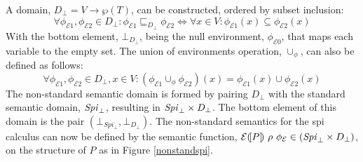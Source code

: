 \documentclass{entcs} \usepackage{entcsmacro}
\begin{document}
A domain, $D_\bot=V\to\wp(T)$, can be constructed, ordered by subset inclusion:
\[\forall\phi_{\mathcal{E}1},\phi_{\mathcal{E}2}\in D_\bot: \phi_{\mathcal{E}1}\sqsubseteq_{D_\bot}\phi_{\mathcal{E}2}\Leftrightarrow\forall x\in V:\phi_{\mathcal{E}1}(x)\subseteq\phi_{\mathcal{E}2}(x)\]
With the bottom element, $\bot_{D_\bot}$, being the null environment, $\phi_{\mathcal{E}0}$, that maps each variable to the empty set. The union of environments operation, $\cup_\phi$, can also be defined as follows:
\[\forall\phi_{\mathcal{E}1},\phi_{\mathcal{E}2}\in D_\bot,x\in V: (\phi_{\mathcal{E}1}\cup_\phi\phi_{\mathcal{E}2})(x)=\phi_{\mathcal{E}1}(x)\cup\phi_{\mathcal{E}2}(x)\]
The non-standard semantic domain is formed by pairing $D_\bot$ with the standard semantic domain, $\mbox{{\itshape Spi\/}}_\bot$, resulting in $\mbox{{\itshape Spi\/}}_\bot\times D_\bot$.  The bottom element of this domain is the pair $(\bot_{Spi_\bot},\bot_{D_\bot})$.  The non-standard semantics for the spi calculus can now be defined by the semantic function, $\mathcal{E}(\![P]\!)~\rho~\phi_\mathcal{E}\in(\mbox{{\itshape Spi\/}}_\bot\times D_\bot)$, on the structure of $P$ as in Figure \ref{nonstandspi}.
\end{document}
